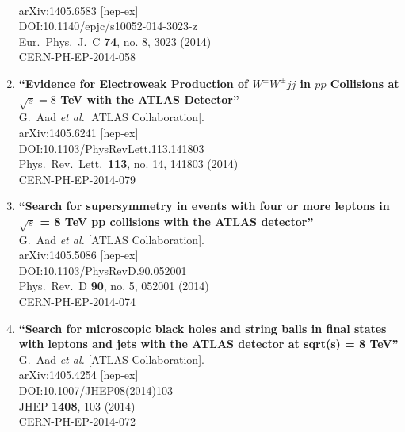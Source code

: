 \documentclass{article}
\begin{document}
\begin{enumerate}
  \\{}arXiv:1405.6583 [hep-ex]
  \\{}DOI:10.1140/epjc/s10052-014-3023-z
  \\{}Eur.\ Phys.\ J.\ C {\bf 74}, no. 8, 3023 (2014)
  \\{}CERN-PH-EP-2014-058
\item%
{\bf ``Evidence for Electroweak Production of $W^{\pm}W^{\pm}jj$ in $pp$ Collisions at $\sqrt{s}=8$ TeV with the ATLAS Detector''}
  \\{}G.~Aad {\it et al.} [ATLAS Collaboration].
  \\{}arXiv:1405.6241 [hep-ex]
  \\{}DOI:10.1103/PhysRevLett.113.141803
  \\{}Phys.\ Rev.\ Lett.\  {\bf 113}, no. 14, 141803 (2014)
  \\{}CERN-PH-EP-2014-079
\item%
{\bf ``Search for supersymmetry in events with four or more leptons in $\sqrt{s}$ = 8 TeV pp collisions with the ATLAS detector''}
  \\{}G.~Aad {\it et al.} [ATLAS Collaboration].
  \\{}arXiv:1405.5086 [hep-ex]
  \\{}DOI:10.1103/PhysRevD.90.052001
  \\{}Phys.\ Rev.\ D {\bf 90}, no. 5, 052001 (2014)
  \\{}CERN-PH-EP-2014-074
\item%
{\bf ``Search for microscopic black holes and string balls in final states with leptons and jets with the ATLAS detector at sqrt(s) = 8 TeV''}
  \\{}G.~Aad {\it et al.} [ATLAS Collaboration].
  \\{}arXiv:1405.4254 [hep-ex]
  \\{}DOI:10.1007/JHEP08(2014)103
  \\{}JHEP {\bf 1408}, 103 (2014)
  \\{}CERN-PH-EP-2014-072

\end{enumerate}
\end{document}

